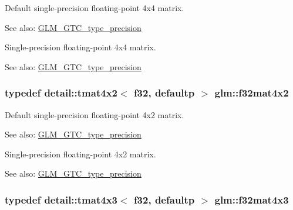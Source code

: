 Default single-precision floating-point 4x4 matrix. \begin{Desc}
\item[See also:]\hyperlink{group__gtc__type__precision}{GLM\_\-GTC\_\-type\_\-precision}\end{Desc}
Single-precision floating-point 4x4 matrix. \begin{Desc}
\item[See also:]\hyperlink{group__gtc__type__precision}{GLM\_\-GTC\_\-type\_\-precision} \end{Desc}
\hypertarget{group__gtc__type__precision_g6aee56c6561190811699bfd2b1cd0d57}{
\subsubsection[f32mat4x2]{\setlength{\rightskip}{0pt plus 5cm}typedef detail::tmat4x2$<$ f32, defaultp $>$ {\bf glm::f32mat4x2}}}
\label{group__gtc__type__precision_g6aee56c6561190811699bfd2b1cd0d57}


Default single-precision floating-point 4x2 matrix. \begin{Desc}
\item[See also:]\hyperlink{group__gtc__type__precision}{GLM\_\-GTC\_\-type\_\-precision}\end{Desc}
Single-precision floating-point 4x2 matrix. \begin{Desc}
\item[See also:]\hyperlink{group__gtc__type__precision}{GLM\_\-GTC\_\-type\_\-precision} \end{Desc}
\hypertarget{group__gtc__type__precision_g5102ae88531e072efe57e75354e10347}{
\subsubsection[f32mat4x3]{\setlength{\rightskip}{0pt plus 5cm}typedef detail::tmat4x3$<$ f32, defaultp $>$ {\bf glm::f32mat4x3}}}
\label{group__gtc__type__precision_g5102ae88531e072efe57e75354e10347}


